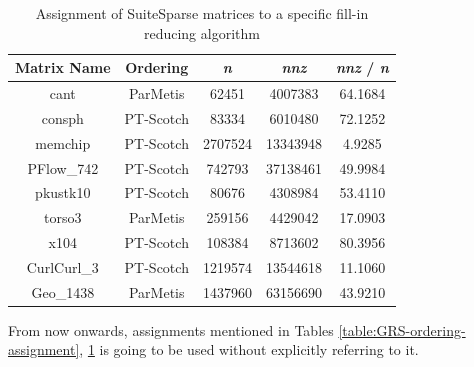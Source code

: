 \begin{table}[htpb]
\centering
\begin{tabular}{|c|c|c|c|c|}
\hline
Matrix Name & Ordering  & \textit{n}       & \textit{nnz}      & \textit{nnz} / \textit{n} \\ \hline
cant        & ParMetis  & 62451   & 4007383  & 64.1684 \\ \hline
consph      & PT-Scotch & 83334   & 6010480  & 72.1252 \\ \hline
memchip     & PT-Scotch & 2707524 & 13343948 & 4.9285  \\ \hline
PFlow\_742  & PT-Scotch & 742793  & 37138461 & 49.9984 \\ \hline
pkustk10    & PT-Scotch & 80676   & 4308984  & 53.4110 \\ \hline
torso3      & ParMetis  & 259156  & 4429042  & 17.0903 \\ \hline
x104        & PT-Scotch & 108384  & 8713602  & 80.3956 \\ \hline
CurlCurl\_3 & PT-Scotch & 1219574 & 13544618 & 11.1060 \\ \hline
Geo\_1438   & ParMetis  & 1437960 & 63156690 & 43.9210 \\ \hline
\end{tabular}
\caption{Assignment of SuiteSparse matrices to a specific fill-in reducing algorithm}
\label{table:SuiteSparse-ordering-assignment}
\end{table}


From now onwards, assignments mentioned in Tables \ref{table:GRS-ordering-assignment}, \ref{table:SuiteSparse-ordering-assignment} is going to be used without explicitly referring to it.\\
